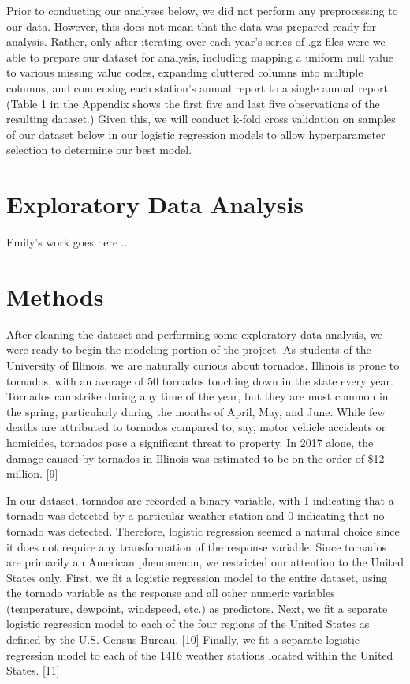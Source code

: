 \documentclass[conference]{IEEEtran}
\begin{document}
Prior to conducting our analyses below, we did not perform any preprocessing to our data. However, this does not mean that the data was prepared ready for analysis. Rather, only after iterating over each year's series of .gz files were we able to prepare our dataset for analysis, including mapping a uniform null value to various missing value codes, expanding cluttered columns into multiple columns, and condensing each station's annual report to a single annual report. (Table 1 in the Appendix shows the first five and last five observations of the resulting dataset.) Given this, we will conduct k-fold cross validation on samples of our dataset below in our logistic regression models to allow hyperparameter selection to determine our best model.

\section{Exploratory Data Analysis}

Emily's work goes here ...

\section{Methods}

After cleaning the dataset and performing some exploratory data analysis, we were ready to begin the modeling portion of the project. As students of the University of Illinois, we are naturally curious about tornados. Illinois is prone to tornados, with an average of 50 tornados touching down in the state every year. Tornados can strike during any time of the year, but they are most common in the spring, particularly during the months of April, May, and June. While few deaths are attributed to tornados compared to, say, motor vehicle accidents or homicides, tornados pose a significant threat to property. In 2017 alone, the damage caused by tornados in Illinois was estimated to be on the order of \$12 million. [9]

In our dataset, tornados are recorded a binary variable, with 1 indicating that a tornado was detected by a particular weather station and 0 indicating that no tornado was detected. Therefore, logistic regression seemed a natural choice since it does not require any transformation of the response variable. Since tornados are primarily an American phenomenon, we restricted our attention to the United States only. First, we fit a logistic regression model to the entire dataset, using the tornado variable as the response and all other numeric variables (temperature, dewpoint, windspeed, etc.) as predictors. Next, we fit a separate logistic regression model to each of the four regions of the United States as defined by the U.S. Census Bureau. [10] Finally, we fit a separate logistic regression model to each of the 1416 weather stations located within the United States. [11]
\end{document}
